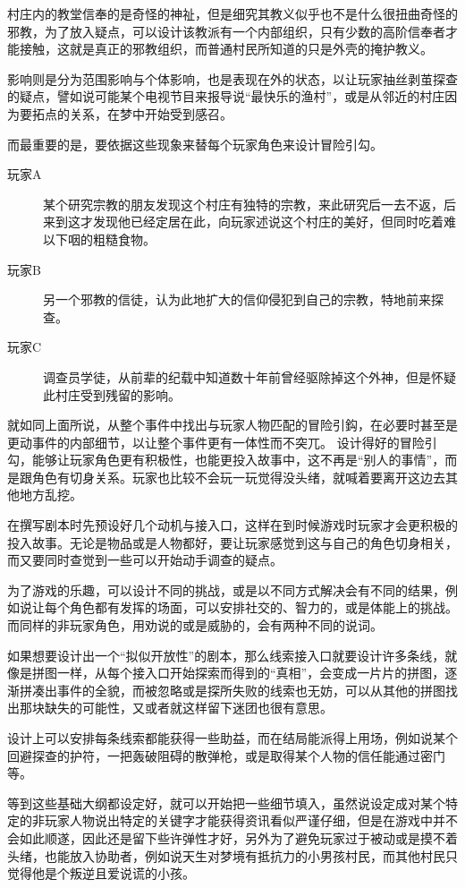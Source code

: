 \documentclass[a4paper,zihao=-4,notitlepage,twoside,openright]{ctexart}
\begin{document}
村庄内的教堂信奉的是奇怪的神祉，但是细究其教义似乎也不是什么很扭曲奇怪的邪教，为了放入疑点，可以设计该教派有一个内部组织，只有少数的高阶信奉者才能接触，这就是真正的邪教组织，而普通村民所知道的只是外壳的掩护教义。

影响则是分为范围影响与个体影响，也是表现在外的状态，以让玩家抽丝剥茧探查的疑点，譬如说可能某个电视节目来报导说“最快乐的渔村”，或是从邻近的村庄因为要拓点的关系，在梦中开始受到感召。

而最重要的是，要依据这些现象来替每个玩家角色来设计冒险引勾。

\begin{description}
\item[玩家A] 某个研究宗教的朋友发现这个村庄有独特的宗教，来此研究后一去不返，后来到这才发现他已经定居在此，向玩家述说这个村庄的美好，但同时吃着难以下咽的粗糙食物。
\item[玩家B] 另一个邪教的信徒，认为此地扩大的信仰侵犯到自己的宗教，特地前来探查。
\item[玩家C] 调查员学徒，从前辈的纪载中知道数十年前曾经驱除掉这个外神，但是怀疑此村庄受到残留的影响。
\end{description}

就如同上面所说，从整个事件中找出与玩家人物匹配的冒险引鈎，在必要时甚至是更动事件的内部细节，以让整个事件更有一体性而不突兀。
设计得好的冒险引勾，能够让玩家角色更有积极性，也能更投入故事中，这不再是“别人的事情”，而是跟角色有切身关系。玩家也比较不会玩一玩觉得没头绪，就喊着要离开这边去其他地方乱挖。

在撰写剧本时先预设好几个动机与接入口，这样在到时候游戏时玩家才会更积极的投入故事。无论是物品或是人物都好，要让玩家感觉到这与自己的角色切身相关，而又要同时查觉到一些可以开始动手调查的疑点。

为了游戏的乐趣，可以设计不同的挑战，或是以不同方式解决会有不同的结果，例如说让每个角色都有发挥的场面，可以安排社交的、智力的，或是体能上的挑战。而同样的非玩家角色，用劝说的或是威胁的，会有两种不同的说词。

如果想要设计出一个“拟似开放性”的剧本，那么线索接入口就要设计许多条线，就像是拼图一样，从每个接入口开始探索而得到的“真相”，会变成一片片的拼图，逐渐拼凑出事件的全貌，而被忽略或是探所失败的线索也无妨，可以从其他的拼图找出那块缺失的可能性，又或者就这样留下迷团也很有意思。

设计上可以安排每条线索都能获得一些助益，而在结局能派得上用场，例如说某个回避探查的护符，一把轰破阻碍的散弹枪，或是取得某个人物的信任能通过密门等。

等到这些基础大纲都设定好，就可以开始把一些细节填入，虽然说设定成对某个特定的非玩家人物说出特定的关键字才能获得资讯看似严谨仔细，但是在游戏中并不会如此顺遂，因此还是留下些许弹性才好，另外为了避免玩家过于被动或是摸不着头绪，也能放入协助者，例如说天生对梦境有抵抗力的小男孩村民，而其他村民只觉得他是个叛逆且爱说谎的小孩。
\end{document}
